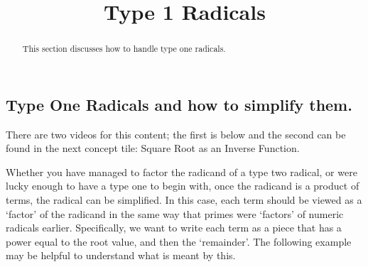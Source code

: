 \documentclass{ximera}
\title{Type 1 Radicals}
\begin{document}
\begin{abstract}
    This section discusses how to handle type one radicals.
\end{abstract}
\maketitle

\subsection*{Type One Radicals and how to simplify them.}

    There are two videos for this content; the first is below and the second can be found in the next concept tile: Square Root as an Inverse Function.
    

    Whether you have managed to factor the radicand of a type two radical, or were lucky enough to have a type one to begin with, once the radicand is a product of terms, the radical can be simplified. In this case, each term should be viewed as a `factor' of the radicand in the same way that primes were `factors' of numeric radicals earlier. Specifically, we want to write each term as a piece that has a power equal to the root value, and then the `remainder'. The following example may be helpful to understand what is meant by this.
\end{document}
